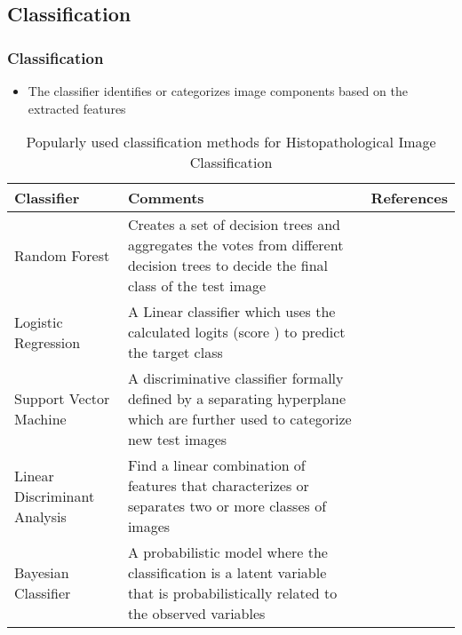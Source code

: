 \documentclass [9pt,times] {beamer}
\begin{document}
\subsection{Classification}\label{Classification}
\begin{frame}\frametitle{Classification}
\justifying
\fontsize{9pt}{11pt}\selectfont
\begin{itemize}
	\item The classifier  identifies or categorizes image components based on the extracted features\\[.20cm]
	
\end{itemize}

\fontsize{7pt}{9pt}\selectfont
\begin{block}{}
	\begin{table}[!t]
		\renewcommand{\arraystretch}{1.5}
		\caption{Popularly used classification methods for Histopathological Image Classification}
		\label{Tab:classification}
		\centering
		\begin{tabular}{p{1.9cm}|p{6.9cm}|p{1cm}}
			\hline
			  \textbf{Classifier}& \textbf{Comments}& \textbf{References}\\
			
			\hline
			Random Forest&  Creates a set of decision trees and aggregates the votes from different decision trees to decide the final class of the test image& \cite{sirinukunwattana2016locality} \cite{strange2013}\\
			
			Logistic Regression &  A Linear classifier which uses the calculated logits (score ) to predict the target class   &\cite{wang2010} \cite{hou2016}	\\
			
			Support Vector Machine &  A discriminative classifier formally defined by a separating hyperplane which are further used to categorize new test images& \cite{sinha2003} \cite{kuse2010} \cite{Rezatofighi2011}\\
			
			Linear Discriminant Analysis & Find a linear combination of features that characterizes or separates two or more classes of images  & \cite{Long2005}\\
			
			Bayesian Classifier &  A probabilistic model where the classification is a latent variable that is probabilistically related to the observed variables & \cite{sinha2003} \cite{Theera2007} \cite{ghosh2010}\\
			\hline
		\end{tabular}
	\end{table}
\end{block}
\end{frame}
\end{document}
